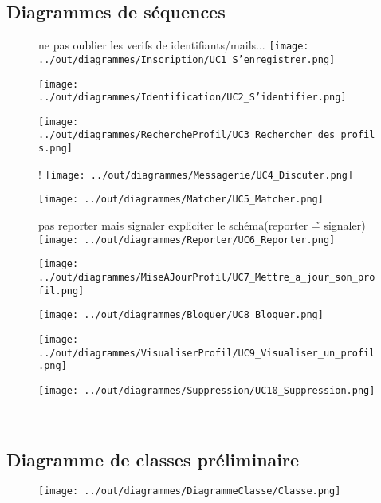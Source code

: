 \documentclass{scrartcl}
\begin{document}
    \subsection{Diagrammes de séquences}{
        \begin{figure}[h!]
            ne pas oublier les verifs de identifiants/mails...\newline
            \texttt{[image: ../out/diagrammes/Inscription/UC1\_S'enregistrer.png]}
        \end{figure}
        \begin{figure}[h!]
            \texttt{[image: ../out/diagrammes/Identification/UC2\_S'identifier.png]}
        \end{figure}
        \begin{figure}[h!]
            \texttt{[image: ../out/diagrammes/RechercheProfil/UC3\_Rechercher\_des\_profils.png]}
        \end{figure}
        \begin{figure}[h]!
            \texttt{[image: ../out/diagrammes/Messagerie/UC4\_Discuter.png]}
        \end{figure}
    	\begin{figure}[h!]
    		\texttt{[image: ../out/diagrammes/Matcher/UC5\_Matcher.png]}
    	\end{figure}
        \begin{figure}[h!]
            pas reporter mais signaler expliciter le schéma(reporter \~= signaler) \newline
    		\texttt{[image: ../out/diagrammes/Reporter/UC6\_Reporter.png]}
    	\end{figure}
       	\begin{figure}[h!]
	    	\texttt{[image: ../out/diagrammes/MiseAJourProfil/UC7\_Mettre\_a\_jour\_son\_profil.png]}
	    \end{figure}
    	\begin{figure}[h!]
    		\texttt{[image: ../out/diagrammes/Bloquer/UC8\_Bloquer.png]}
    	\end{figure}
    	\begin{figure}[h!]
    		\texttt{[image: ../out/diagrammes/VisualiserProfil/UC9\_Visualiser\_un\_profil.png]}
    	\end{figure}
    	\begin{figure}[h!]
    		\texttt{[image: ../out/diagrammes/Suppression/UC10\_Suppression.png]}
    	\end{figure}
    }
\newpage
~
\newpage
~
\newpage
~
\newpage
    \subsection{Diagramme de classes préliminaire}{
		\begin{figure}[h]
            \centering
			\texttt{[image: ../out/diagrammes/DiagrammeClasse/Classe.png]}
		\end{figure}
	}
\end{document}
